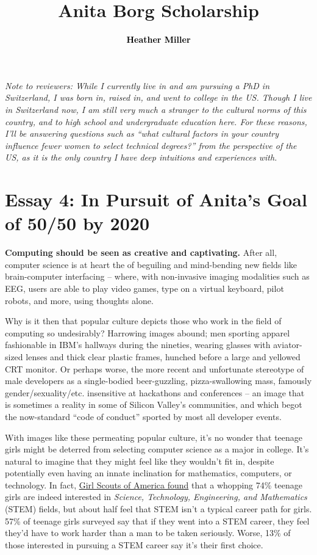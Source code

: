 \documentclass[acmtocl]{acmtrans2m}
\title{{\color{Black}Anita Borg Scholarship}}
\author{\textcolor{Black}{\textbf{Heather Miller}}}
\begin{document}
\setmonofont[Mapping=tex-text,Scale=0.9]{Inconsolata}
%
\maketitle

{\em Note to reviewers: While I currently live in and am pursuing a PhD in
Switzerland, I was born in, raised in, and went to college in the US. Though I
live in Switzerland now, I am still very much a stranger to the cultural norms
of this country, and to high school and undergraduate education here. For
these reasons, I'll be answering questions such as ``what cultural factors in
your country influence fewer women to select technical degrees?'' from the
perspective of the US, as it is the only country I have deep intuitions and
experiences with.}

\section*{\textbf{Essay 4:} In Pursuit of Anita's Goal of 50/50 by 2020}

\textbf{Computing should be seen as creative and captivating.}
After all, computer science is at heart the of beguiling and mind-bending new
fields like {brain-computer} interfacing -- where, with non-invasive imaging
modalities such as EEG, users are able to play video games, type on a virtual
keyboard, pilot robots, and more, using thoughts alone.

Why is it then that popular culture depicts those who work in the field of
computing so undesirably? Harrowing images abound; men sporting apparel
fashionable in IBM's hallways during the nineties, wearing glasses with
aviator-sized lenses and thick clear plastic frames, hunched before a large
and yellowed CRT monitor. Or perhaps worse, the more recent and unfortunate
stereotype of male developers as a {single-bodied} {beer-guzzling},
{pizza-swallowing} mass, famously gender/sexuality/etc. insensitive at
hackathons and conferences -- an image that is sometimes a reality in
some of Silicon Valley's communities, and which begot the {now-standard} ``code
of conduct'' sported by most all developer events.

With images like these permeating popular culture, it's no wonder that teenage
girls might be deterred from selecting computer science as a major in college.
It's natural to imagine that they might feel like they wouldn't fit in,
despite potentially even having an innate inclination for mathematics,
computers, or technology. In fact,
\href{https://www.girlscouts.org/research/pdf/generation\_stem\_full\_report.pdf}{Girl Scouts of America found}
\cite{Girlscouts} that a whopping 74\% teenage girls are indeed interested in {\em
Science, Technology, Engineering, and Mathematics} (STEM) fields, but about
half feel that STEM isn't a typical career path for girls. 57\% of teenage
girls surveyed say that if they went into a STEM career, they feel they'd have
to work harder than a man to be taken seriously. Worse, 13\% of those
interested in pursuing a STEM career say it's their first choice.
\end{document}
